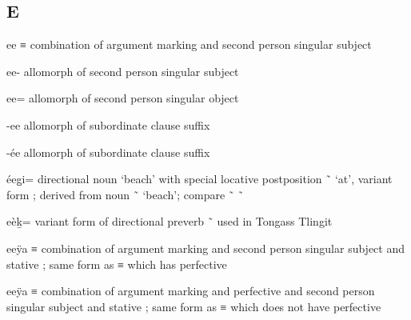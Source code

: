 
\subsection{E}\label{sec:alphalist-e}
\begin{morphdesc}[resume*=alphalist]
\item[ee]\label{m:ee}
	≡ 
	combination of argument marking 
		and second person singular subject 

\item[ee-]
	allomorph of second person singular subject 

\item[ee=]
	allomorph of second person singular object 

\item[-ee]\label{m:-ee-sub}
	allomorph of subordinate clause suffix 

\item[-ée]\label{m:-ée-sub}
	allomorph of subordinate clause suffix 

\item[éeg̱i=]
	directional noun ‘beach’ with special locative postposition  \~\  ‘at’,
	variant form ;
	derived from noun  \~\  ‘beach’;
	compare  \~\  \~\ 

\item[eèḵ=]
	variant form of directional preverb  \~\  used in Tongass Tlingit

\item[eeÿa]\label{m:eeÿa-a-i-ÿa}
	≡ 
	combination of argument marking 
		and second person singular subject 
		and stative ;
	same form as  ≡ 
		which has perfective 

\item[eeÿa]\label{m:eeÿa-a-ʷ-i-ÿa}
	≡ 
	combination of argument marking 
		and perfective 
		and second person singular subject 
		and stative ;
	same form as  ≡ 
		which does not have perfective 


\end{morphdesc}
